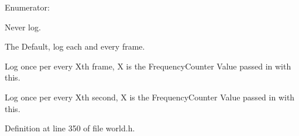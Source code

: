 \begin{Desc}
\item[Enumerator: ]\par
\begin{description}
\item[{\em 
\hypertarget{classphys_1_1World_a8c754464edbb78270fa0ee1e395b963da477724952d47abb95e5addd925fc2ec6}{
LogNever}
\label{classphys_1_1World_a8c754464edbb78270fa0ee1e395b963da477724952d47abb95e5addd925fc2ec6}
}]Never log. \item[{\em 
\hypertarget{classphys_1_1World_a8c754464edbb78270fa0ee1e395b963dafce667b90c7842e6452d09f4954b6fe7}{
LogOncePerFrame}
\label{classphys_1_1World_a8c754464edbb78270fa0ee1e395b963dafce667b90c7842e6452d09f4954b6fe7}
}]The Default, log each and every frame. \item[{\em 
\hypertarget{classphys_1_1World_a8c754464edbb78270fa0ee1e395b963da017fb8da8ff480a3b3190c96cdddde74}{
LogOncePerXFrames}
\label{classphys_1_1World_a8c754464edbb78270fa0ee1e395b963da017fb8da8ff480a3b3190c96cdddde74}
}]Log once per every Xth frame, X is the FrequencyCounter Value passed in with this. \item[{\em 
\hypertarget{classphys_1_1World_a8c754464edbb78270fa0ee1e395b963da5acb020cb6b0f759ecd25c413927be55}{
LogOncePerXSeconds}
\label{classphys_1_1World_a8c754464edbb78270fa0ee1e395b963da5acb020cb6b0f759ecd25c413927be55}
}]Log once per every Xth second, X is the FrequencyCounter Value passed in with this. \end{description}
\end{Desc}



Definition at line 350 of file world.h.



